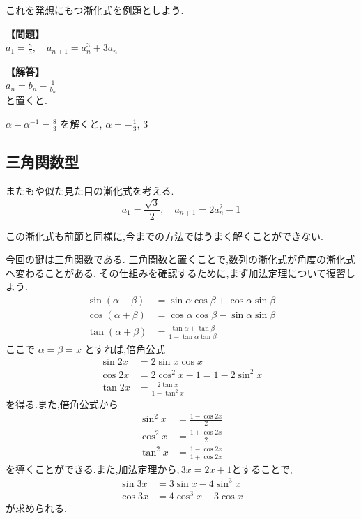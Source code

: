 これを発想にもつ漸化式を例題としよう.

\noindent\textbf{【問題】}\\
$a_1=\frac{8}{3},\quad a_{n+1}=a_n^3+3a_n$

\noindent\textbf{【解答】}\\
$a_n=b_n-\frac{1}{b_n}$\\
と置くと.

$\displaystyle \alpha-\alpha^{-1}=\frac{8}{3}$
を解くと,
$\displaystyle \alpha=-\frac{1}{3},\,3$






\subsection{三角関数型}
またもや似た見た目の漸化式を考える.
\[
  a_1=\frac{\sqrt{3}}{2},\quad a_{n+1}=2a_n^2-1
\]

この漸化式も前節と同様に,今までの方法ではうまく解くことができない.

今回の鍵は三角関数である.
三角関数と置くことで,数列の漸化式が角度の漸化式へ変わることがある.
その仕組みを確認するために,まず加法定理について復習しよう.
\begin{align*}
  \sin(\alpha+\beta)
    &=\sin\alpha\cos\beta+\cos\alpha\sin\beta\\
  \cos(\alpha+\beta)
    &=\cos\alpha\cos\beta-\sin\alpha\sin\beta\\
  \tan(\alpha+\beta)
    &=\frac{\tan\alpha+\tan\beta}
            {1-\tan\alpha\tan\beta}
\end{align*}
ここで $\alpha=\beta=x$ とすれば,倍角公式
\begin{align*}
  \sin 2x&=2\sin x\cos x\\
  \cos 2x&=2\cos^2x-1=1-2\sin^2x\\
  \tan 2x&=\frac{2\tan x}{1-\tan^2x}
\end{align*}
を得る.また,倍角公式から
\begin{align*}
  \sin^2x&=\frac{1-\cos 2x}{2}\\
  \cos^2x&=\frac{1+\cos 2x}{2}\\
  \tan^2x&=\frac{1-\cos 2x}{1+\cos 2x}
\end{align*}
を導くことができる.また,加法定理から,\,$3x=2x+1$とすることで,
\begin{align*}
  \sin 3x&=3\sin x-4\sin^3x\\
  \cos 3x&=4\cos^3x-3\cos x
\end{align*}
が求められる.

